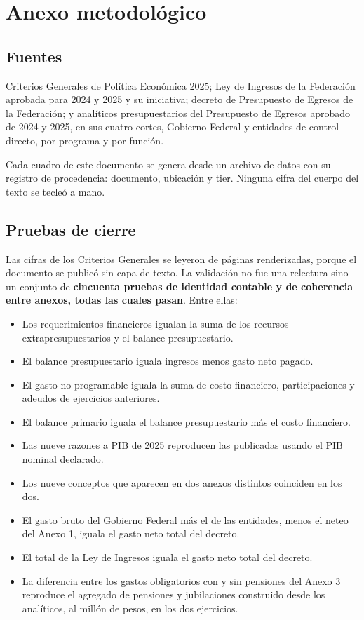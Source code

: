\chapter*{Anexo metodológico}

\section*{Fuentes}

Criterios Generales de Política Económica 2025; Ley de Ingresos de la Federación
aprobada para 2024 y 2025 y su iniciativa; decreto de Presupuesto de Egresos de la
Federación; y analíticos presupuestarios del Presupuesto de Egresos aprobado de
2024 y 2025, en sus cuatro cortes, Gobierno Federal y entidades de control
directo, por programa y por función.

Cada cuadro de este documento se genera desde un archivo de datos con su registro
de procedencia: documento, ubicación y tier. Ninguna cifra del cuerpo del texto se
tecleó a mano.

\section*{Pruebas de cierre}

Las cifras de los Criterios Generales se leyeron de páginas renderizadas, porque
el documento se publicó sin capa de texto. La validación no fue una relectura sino
un conjunto de \textbf{cincuenta pruebas de identidad contable y de coherencia
entre anexos, todas las cuales pasan}. Entre ellas:

\begin{itemize}
\item Los requerimientos financieros igualan la suma de los recursos
extrapresupuestarios y el balance presupuestario.
\item El balance presupuestario iguala ingresos menos gasto neto pagado.
\item El gasto no programable iguala la suma de costo financiero, participaciones
y adeudos de ejercicios anteriores.
\item El balance primario iguala el balance presupuestario más el costo
financiero.
\item Las nueve razones a PIB de 2025 reproducen las publicadas usando el PIB
nominal declarado.
\item Los nueve conceptos que aparecen en dos anexos distintos coinciden en los
dos.
\item El gasto bruto del Gobierno Federal más el de las entidades, menos el
neteo del Anexo 1, iguala el gasto neto total del decreto.
\item El total de la Ley de Ingresos iguala el gasto neto total del decreto.
\item La diferencia entre los gastos obligatorios con y sin pensiones del Anexo 3
reproduce el agregado de pensiones y jubilaciones construido desde los analíticos,
al millón de pesos, en los dos ejercicios.
\end{itemize}

